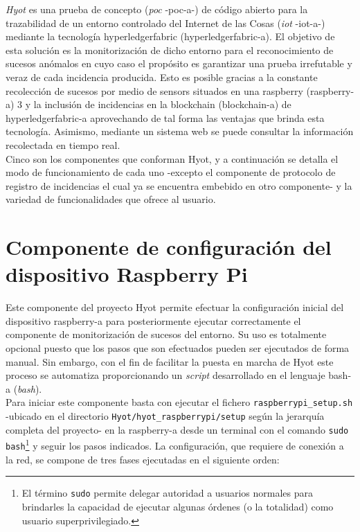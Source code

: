 \documentclass[12pt,a4paper, twoside]{report}
\begin{document}
	\textit{Hyot} es una prueba de concepto (\textit{\gls{poc}} -\gls{poc-a}-) de código abierto para la trazabilidad de un entorno controlado del Internet de las Cosas (\textit{\gls{iot}} -\gls{iot-a}-) mediante la tecnología \gls{hyperledgerfabric} (\gls{hyperledgerfabric-a}). El objetivo de esta solución es la monitorización de dicho entorno para el reconocimiento de sucesos anómalos en cuyo caso el propósito es garantizar una prueba irrefutable y veraz de cada incidencia producida. Esto es posible gracias a la constante recolección de sucesos por medio de \glspl{sensor} situados en una \gls{raspberry} (\gls{raspberry-a}) 3 y la inclusión de incidencias en la \Gls{blockchain} (\gls{blockchain-a}) de \gls{hyperledgerfabric-a} aprovechando de tal forma las ventajas que brinda esta tecnología. Asimismo, mediante un sistema web se puede consultar la información recolectada en tiempo real. \\
	
	 Cinco son los componentes que conforman Hyot, y a continuación se detalla el modo de funcionamiento de cada uno -excepto el componente de protocolo de registro de incidencias el cual ya se encuentra embebido en otro componente- y la variedad de funcionalidades que ofrece al usuario.
	 
	 \section{Componente de configuración del dispositivo Raspberry Pi} \label{setup_rpi}
	 
	 Este componente del proyecto Hyot permite efectuar la configuración inicial del dispositivo \gls{raspberry-a} para posteriormente ejecutar correctamente el componente de monitorización de sucesos del entorno. Su uso es totalmente opcional puesto que los pasos que son efectuados pueden ser ejecutados de forma manual. Sin embargo, con el fin de facilitar la puesta en marcha de Hyot este proceso se automatiza proporcionando un \textit{\gls{script}} desarrollado en el lenguaje \gls{bash-a} (\textit{\gls{bash}}). \\
	 
	Para iniciar este componente basta con ejecutar el fichero \texttt{raspberrypi\_setup.sh} -ubicado en el directorio \texttt{Hyot/hyot\_raspberrypi/setup} según la jerarquía completa del proyecto- en la \gls{raspberry-a} desde un terminal con el comando \texttt{sudo bash}\footnote{El término \texttt{sudo} permite delegar autoridad a usuarios normales para brindarles la capacidad de ejecutar algunas órdenes (o la totalidad) como usuario superprivilegiado.} y seguir los pasos indicados. La configuración, que requiere de conexión a la red, se compone de tres fases ejecutadas en el siguiente orden:
	
\end{document}
